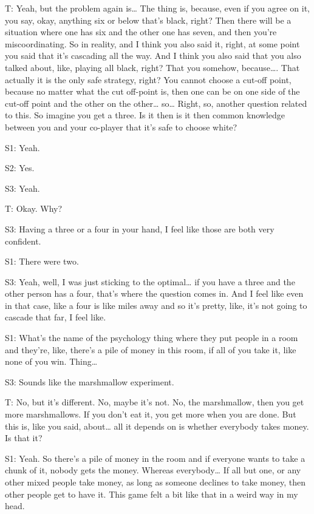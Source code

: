 \documentclass[a4paper,superscriptaddress,nofootinbib]{revtex4}
\begin{document}
T: Yeah, but the problem again is… The thing is, because, even if you agree on it, you say, okay, anything six or below that's black, right? Then there will be a situation where one has six and the other one has seven, and then you're miscoordinating. So in reality, and I think you also said it, right, at some point you said that it's cascading all the way. And I think you also said that you also talked about, like, playing all black, right? That you somehow, because…. That actually it is the only safe strategy, right? You cannot choose a cut-off point, because no matter what the cut off-point is, then one can be on one side of the cut-off point and the other on the other… so… Right, so, another question related to this. So imagine you get a three. Is it then is it then common knowledge between you and your co-player that it's safe to choose white? 

S1: Yeah. 

S2: Yes. 

S3: Yeah. 

T: Okay. Why? 

S3: Having a three or a four in your hand, I feel like those are both very confident. 

S1: There were two.

S3: Yeah, well, I was just sticking to the optimal… if you have a three and the other person has a four, that's where the question comes in. And I feel like even in that case, like a four is like miles away and so it's pretty, like, it's not going to cascade that far, I feel like.  

S1: What's the name of the psychology thing where they put people in a room and they're, like, there's a pile of money in this room, if all of you take it, like none of you win. Thing…

S3: Sounds like the marshmallow experiment. 

T: No, but it's different. No, maybe it's not. No, the marshmallow, then you get more marshmallows. If you don't eat it, you get more when you are done. But this is, like you said, about… all it depends on is whether everybody takes money. Is that it? 

S1: Yeah. So there's a pile of money in the room and if everyone wants to take a chunk of it, nobody gets the money. Whereas everybody… If all but one, or any other mixed people take money, as long as someone declines to take money, then other people get to have it. This game felt a bit like that in a weird way in my head. 
\end{document}
